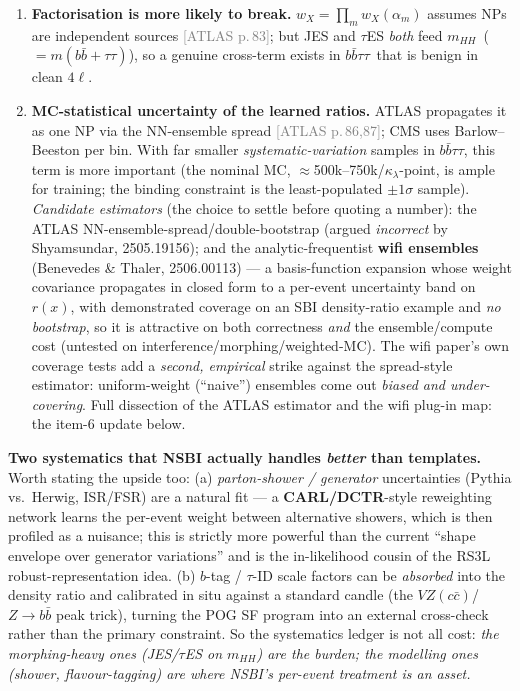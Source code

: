 \documentclass[11pt]{article}
\newcommand{\kl}{\ensuremath{\kappa_\lambda}}
\newcommand{\mhh}{\ensuremath{m_{HH}}}
\newcommand{\bbtt}{\ensuremath{b\bar b\tau\tau}}
\newcommand{\pA}[1]{\textcolor{gray}{\small[ATLAS p.\,#1]}}
\begin{document}
\begin{enumerate}[leftmargin=1.4em]
  way. A faithful \emph{per-event} treatment would require POI-coupled morphing --- but see the AN-25-103
  reassessment below: the \emph{rate} part is handled pointwise without any such object; only the \emph{shape}
  part remains open.
\item \textbf{Factorisation is more likely to break.} $w_X=\prod_m w_X(\alpha_m)$ assumes NPs are independent
  sources \pA{83}; but JES and $\tau$ES \emph{both} feed \mhh\ ($=m(b\bar b+\tau\tau)$), so a genuine cross-term
  exists in \bbtt\ that is benign in clean $4\ell$.
\item \textbf{MC-statistical uncertainty of the learned ratios.} ATLAS propagates it as one NP via the
  NN-ensemble spread \pA{86,87}; CMS uses Barlow--Beeston per bin. With far smaller \emph{systematic-variation}
  samples in \bbtt, this term is more important (the nominal MC, $\approx$500k--750k/\kl-point, is ample for
  training; the binding constraint is the least-populated $\pm1\sigma$ sample). \emph{Candidate estimators} (the
  choice to settle before quoting a number): the ATLAS NN-ensemble-spread/double-bootstrap (argued \emph{incorrect}
  by Shyamsundar, 2505.19156); and the analytic-frequentist \textbf{wifi ensembles} (Benevedes \& Thaler,
  2506.00113) --- a basis-function expansion whose weight covariance propagates in closed form to a per-event
  uncertainty band on $r(x)$, with demonstrated coverage on an SBI density-ratio example and \emph{no bootstrap},
  so it is attractive on both correctness \emph{and} the ensemble/compute cost (untested on
  interference/morphing/weighted-MC). The wifi paper's own coverage tests add a \emph{second, empirical} strike
  against the spread-style estimator: uniform-weight (``naive'') ensembles come out \emph{biased and
  under-covering}. Full dissection of the ATLAS estimator and the wifi plug-in map: the item-6 update below.
\end{enumerate}

\medskip\noindent\textbf{Two systematics that NSBI actually handles \emph{better} than templates.} Worth stating
the upside too: (a) \emph{parton-shower / generator} uncertainties (Pythia vs.\ Herwig, ISR/FSR) are a natural fit
--- a \textbf{CARL/DCTR}-style reweighting network learns the per-event weight between alternative showers, which is
then profiled as a nuisance; this is strictly more powerful than the current ``shape envelope over generator
variations'' and is the in-likelihood cousin of the RS3L robust-representation idea. (b) $b$-tag / $\tau$-ID scale
factors can be \emph{absorbed} into the density ratio and calibrated in situ against a standard candle (the
$VZ(c\bar c)$/$Z\to b\bar b$ peak trick), turning the POG SF program into an external cross-check rather than the
primary constraint. So the systematics ledger is not all cost: \emph{the morphing-heavy ones (JES/$\tau$ES on
\mhh) are the burden; the modelling ones (shower, flavour-tagging) are where NSBI's per-event treatment is an
asset.}
\end{document}
